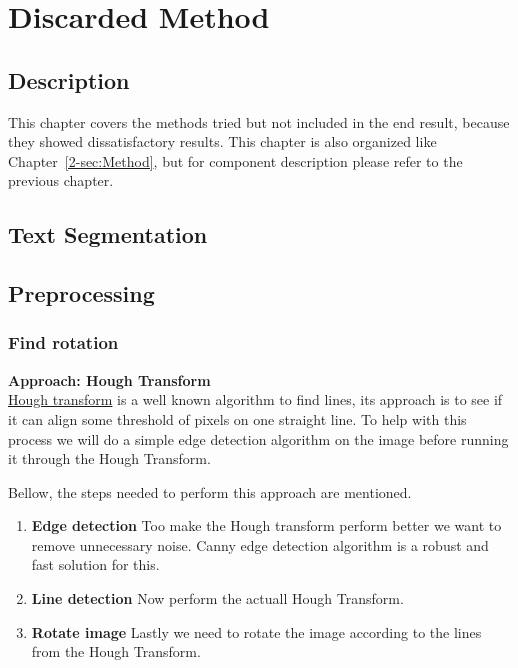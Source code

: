 \documentclass[Report.tex]{subfiles}
\begin{document}
\chapter{Discarded Method}
\label{sec:Discarded Method}
\section{Description}
This chapter covers the methods tried but not included in the end result, because they showed dissatisfactory results. This chapter is also organized like Chapter~\ref{2-sec:Method}, but for component description please refer to the previous chapter.

\section{Text Segmentation}
\section{Preprocessing}
\subsection{Find rotation}

\begin{flushleft}
  \textbf{Approach: Hough Transform} \\
  \href{https://en.wikipedia.org/wiki/Hough_transform}{Hough transform} is a well known algorithm to find lines, its approach is to see if it can align some threshold of pixels on one straight line. To help with this process we will do a simple edge detection algorithm on the image before running it through the Hough Transform. \par Bellow, the steps needed to perform this approach are mentioned.

  \begin{enumerate}
    \item \textbf{Edge detection}
    Too make the Hough transform perform better we want to remove unnecessary noise. Canny edge detection algorithm is a robust and fast solution for this.
    \item \textbf{Line detection}
    Now perform the actuall Hough Transform.
    \item \textbf{Rotate image}
    Lastly we need to rotate the image according to the lines from the Hough Transform.
  \end{enumerate}
\end{flushleft}
\end{document}
